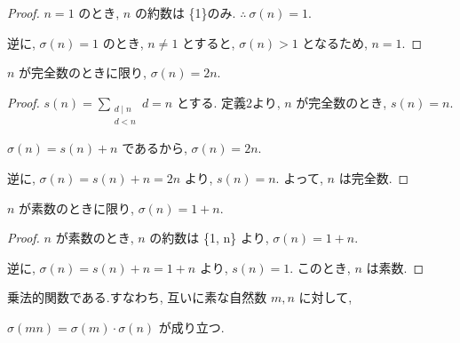 \begin{proof}
\(n = 1\) のとき, \(n\) の約数は \{1\}のみ. \(\therefore ~\sigma(n) = 1\).

逆に, \(\sigma(n) = 1\) のとき, \(n \neq 1\) とすると, \(\sigma(n) > 1\) となるため, \(n = 1\).

\end{proof}

\begin{lemma}\label{perfect_iff_sum_divisors_eq_two_mul}
\leanok{}

\(n\) が完全数のときに限り, \(\sigma(n) = 2n\).

\end{lemma}

\begin{proof}
\(s(n) = \sum_{\substack{d \mid n\\ d < n}} d = n\) とする.
定義2より, \(n\) が完全数のとき, \(s(n) = n\).

\(\sigma(n) = s(n) + n\) であるから, \(\sigma(n) = 2n\).

逆に, \(\sigma(n) = s(n) + n = 2n\) より, \(s(n) = n\).
よって, \(n\) は完全数.
\end{proof}

\begin{lemma}\label{prime_iff_sum_divisors_eq_succ}
\leanok{}

\(n\) が素数のときに限り, \(\sigma(n) =  1 + n\).

\end{lemma}

\begin{proof}
\(n\) が素数のとき, \(n\) の約数は \{1, n\} より, \(\sigma(n) = 1 + n\).

逆に, \(\sigma(n) = s(n) + n = 1 + n\) より, \(s(n) = 1\).
このとき, \(n\) は素数.
\end{proof}

\begin{lemma}\label{isMultiplicative}\leanok{}
乗法的関数である.すなわち, 互いに素な自然数 \(m, n\) に対して,

\(\sigma(mn) = \sigma(m) \cdot \sigma(n)\) が成り立つ.

\end{lemma}

